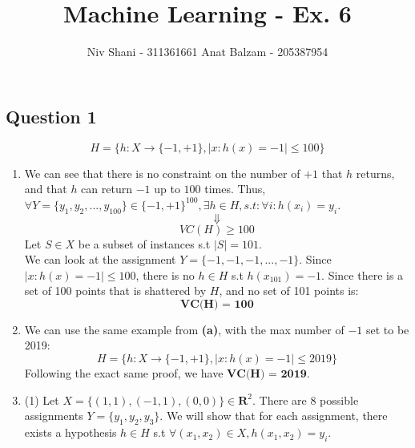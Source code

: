\documentclass{article}
\begin{document}
	\title{\textbf{Machine Learning - Ex. 6}}
	\author{Niv Shani - 311361661 {\quad} Anat Balzam - 205387954}
	\maketitle
	
	\subsection*{Question 1}
	$${H=\{h:X\rightarrow \{-1,+1\} , | x:h(x)=-1 | \leq 100\}}$$
	
	\renewcommand{\labelenumi}{\textbf{(\alph{enumi})}}
	\begin{enumerate}
		\item We can see that there is no constraint on the number of ${+1}$ that ${h}$ returns, and that ${h}$ can return ${-1}$ up to ${100}$ times. Thus, ${\forall Y = \{y_1, y_2, ..., y_{100}\} \in \{-1,+1\}^{100}}, \exists h\in H, s.t: \forall i: h(x_i) = y_i$.
		$${\Downarrow}$$
		$${VC(H) \geq 100}$$
		Let ${S \in X}$ be a subset of instances s.t ${|S|=101}$.\\
		We can look at the assignment ${Y=\{-1,-1,-1,...,-1\}}$. Since ${|x: h(x)=-1|\leq 100}$, there is no ${h \in H}$ s.t ${h(x_{101})=-1}$. Since there is a set of 100 points that is shattered by ${H}$, and no set of 101 points is:
		$${\textbf{VC(H) = 100}}$$
		
		\item We can use the same example from \textbf{(a)}, with the max number of ${-1}$ set to be 2019:
		$${H=\{h:X\rightarrow \{-1,+1\} , | x:h(x)=-1 | \leq 2019\}}$$
		Following the exact same proof, we have ${\textbf{VC(H) = 2019}}$.
		
		\item (1) Let ${X = \{(1,1), (-1,1), (0,0)\} \in \mathbf{R}^2}$. There are 8 possible assignments ${Y = \{y_1,y_2,y_3\}}$. We will show that for each assignment, there exists a hypothesis ${h \in H}$ s.t ${\forall (x_1,x_2) \in X,  h(x_1,x_2) = y_i}$.
		

\end{enumerate}
\end{document}

